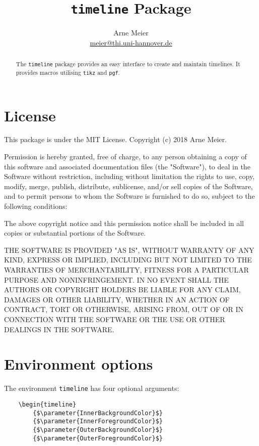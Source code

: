 \documentclass{article}
\author{Arne Meier\\\url{meier@thi.uni-hannover.de}}
\title{\texttt{timeline} Package}
\newcommand{\parameter}[1]{\langle\normalfont\textit{#1}\rangle}
\begin{document}
\maketitle
\begin{abstract}
	The \texttt{timeline} package provides an easy interface to create and maintain timelines.
	It provides macros utilising \texttt{tikz} and \texttt{pgf}.
\end{abstract}

\section{License}
This package is under the MIT License. Copyright (c) 2018 Arne Meier.

Permission is hereby granted, free of charge, to any person obtaining a copy
of this software and associated documentation files (the "Software"), to deal
in the Software without restriction, including without limitation the rights
to use, copy, modify, merge, publish, distribute, sublicense, and/or sell
copies of the Software, and to permit persons to whom the Software is
furnished to do so, subject to the following conditions:

The above copyright notice and this permission notice shall be included in all
copies or substantial portions of the Software.

THE SOFTWARE IS PROVIDED "AS IS", WITHOUT WARRANTY OF ANY KIND, EXPRESS OR
IMPLIED, INCLUDING BUT NOT LIMITED TO THE WARRANTIES OF MERCHANTABILITY,
FITNESS FOR A PARTICULAR PURPOSE AND NONINFRINGEMENT. IN NO EVENT SHALL THE
AUTHORS OR COPYRIGHT HOLDERS BE LIABLE FOR ANY CLAIM, DAMAGES OR OTHER
LIABILITY, WHETHER IN AN ACTION OF CONTRACT, TORT OR OTHERWISE, ARISING FROM,
OUT OF OR IN CONNECTION WITH THE SOFTWARE OR THE USE OR OTHER DEALINGS IN THE
SOFTWARE.

\section{Environment options}
The environment \texttt{timeline} has four optional arguments:
\begin{center}
\begin{lstlisting}
	\begin{timeline}
		{$\parameter{InnerBackgroundColor}$}
		{$\parameter{InnerForegroundColor}$}
		{$\parameter{OuterBackgroundColor}$}
		{$\parameter{OuterForegroundColor}$}
\end{lstlisting}
\end{center}
\end{document}
